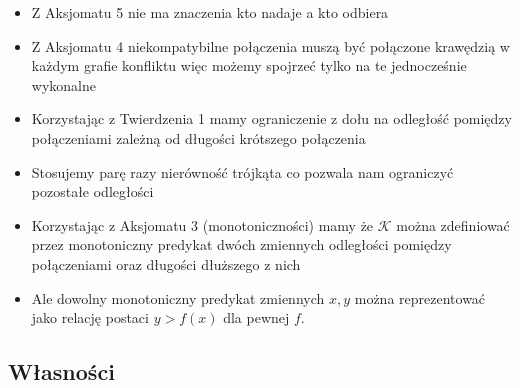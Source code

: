 \documentclass[polish, t,10pt]{beamer}
\begin{document}
    \begin{frame}
        \begin{itemize}
            \item Z Aksjomatu 5 nie ma znaczenia kto nadaje a kto odbiera
            \item Z Aksjomatu 4 niekompatybilne połączenia muszą być połączone krawędzią w każdym grafie konfliktu więc możemy spojrzeć tylko na te jednocześnie wykonalne
            \item Korzystając z Twierdzenia 1 mamy ograniczenie z dołu na odległość pomiędzy połączeniami zależną od długości krótszego połączenia
            \item Stosujemy parę razy nierówność trójkąta co pozwala nam ograniczyć pozostałe odległości
            \item Korzystając z Aksjomatu 3 (monotoniczności) mamy że $\mathcal{K}$ można zdefiniować przez monotoniczny predykat dwóch zmiennych odległości pomiędzy połączeniami oraz długości dłuższego z nich
            \item Ale dowolny monotoniczny predykat zmiennych $x,y$ można reprezentować jako relację postaci $y > f(x)$ dla pewnej $f$.
        \end{itemize}
    \end{frame}

\subsection{Własności}
\end{document}
